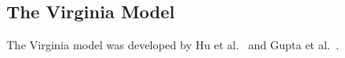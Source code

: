 \subsection{The Virginia Model}

The Virginia model was developed by Hu et al.~\cite{hu19rooftop} and Gupta et al.~\cite{gupta18rooftop_css}.
